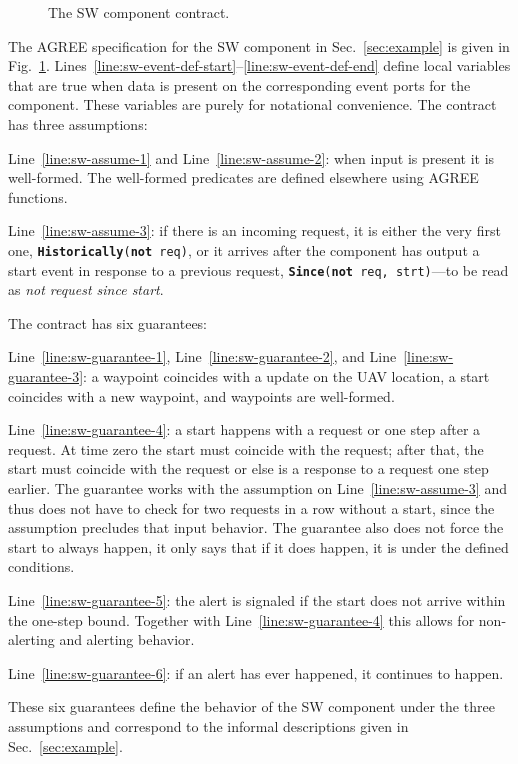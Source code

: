 \documentclass[global,twocolumn]{svjour}
\newcommand{\figref}[1]{Fig.~\ref{#1}}
\newcommand{\secref}[1]{Sec.~\ref{#1}}
\newcommand{\lineref}[1]{Line~\ref{#1}}
\newcommand{\linesref}[2]{Lines~\ref{#1}--\ref{#2}}
\begin{document}
\begin{figure}
  \begin{center}
    \resizebox{\columnwidth}{!}{\usebox{\sw}}
  \end{center}
  \caption{The SW component contract.}
  \label{fig:sw}
\end{figure}

The AGREE specification for the SW component in \secref{sec:example} is given in \figref{fig:sw}.
%
\linesref{line:sw-event-def-start}{line:sw-event-def-end} define local variables that are true when data is present on the corresponding event ports for the component.  These variables are
purely for notational convenience.
%
The contract has three assumptions:
%
\begin{compactitem}
\item
\lineref{line:sw-assume-1} and \lineref{line:sw-assume-2}:
%
when input is present it is well-formed.
%
The well-formed predicates are defined elsewhere using AGREE functions.

\item
\lineref{line:sw-assume-3}:
%
if there is an incoming request, it is either the very first one, \texttt{\textbf{Historically}(\textbf{not} req)}, or it arrives after the component has output a start event in response to a previous request, \texttt{\textbf{Since}(\textbf{not} req, strt)}---to be read as \emph{not
request since start}.
\end{compactitem}

\noindent The contract has six guarantees:
%
\begin{compactitem}
\item
\lineref{line:sw-guarantee-1}, \lineref{line:sw-guarantee-2}, and \lineref{line:sw-guarantee-3}:
%
a waypoint coincides with a update on the UAV location, a start coincides with a new waypoint, and waypoints are well-formed.

\item
\lineref{line:sw-guarantee-4}:
%
a start happens with a request or one step after a request.
%
At time zero the start must coincide with the request;
%
after that, the start must coincide with the request or else is a response to a request one step earlier.
%
The guarantee works with the assumption on \lineref{line:sw-assume-3} and thus does not have to check for two requests in a row without a start, since the assumption precludes that input behavior.
%
The guarantee also does not force the start to always happen, it only says that if it does happen, it is under the defined conditions.

\item
\lineref{line:sw-guarantee-5}:
%
the alert is signaled if the start does not arrive within the one-step bound.
%
Together with \lineref{line:sw-guarantee-4} this allows for non-alerting and alerting behavior.

\item
%
\lineref{line:sw-guarantee-6}:
%
if an alert has ever happened, it continues to happen.
\end{compactitem}
%
These six guarantees define the behavior of the SW component under the three assumptions and correspond to the informal descriptions given in \secref{sec:example}.
\end{document}
